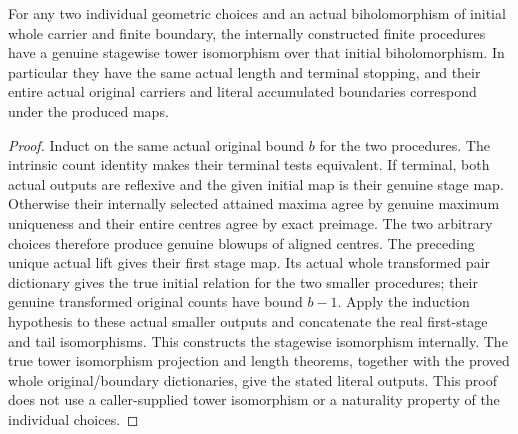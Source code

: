 \begin{theorem}
\label{hir:general-nc-actual-finite-choice-comparison}
\leanok
For any two individual geometric choices and an actual biholomorphism
of initial whole carrier and finite boundary, the internally constructed
finite procedures have a genuine stagewise tower isomorphism over that
initial biholomorphism. In particular they have the same actual length
and terminal stopping, and their entire actual original carriers and
literal accumulated boundaries correspond under the produced maps.
\end{theorem}
\begin{proof}
Induct on the same actual original bound $b$ for the two procedures.
The intrinsic count identity makes their terminal tests equivalent.
If terminal, both actual outputs are reflexive and the given initial
map is their genuine stage map. Otherwise their internally selected
attained maxima agree by genuine maximum uniqueness and their entire
centres agree by exact preimage. The two arbitrary choices therefore
produce genuine blowups of aligned centres. The preceding unique
actual lift gives their first stage map. Its actual whole transformed
pair dictionary gives the true initial relation for the two smaller
procedures; their genuine transformed original counts have bound
$b-1$. Apply the induction hypothesis to these actual smaller outputs
and concatenate the real first-stage and tail isomorphisms. This
constructs the stagewise isomorphism internally. The true tower
isomorphism projection and length theorems, together with the proved
whole original/boundary dictionaries, give the stated literal outputs.
This proof does not use a caller-supplied tower isomorphism or a
naturality property of the individual choices.
\end{proof}

